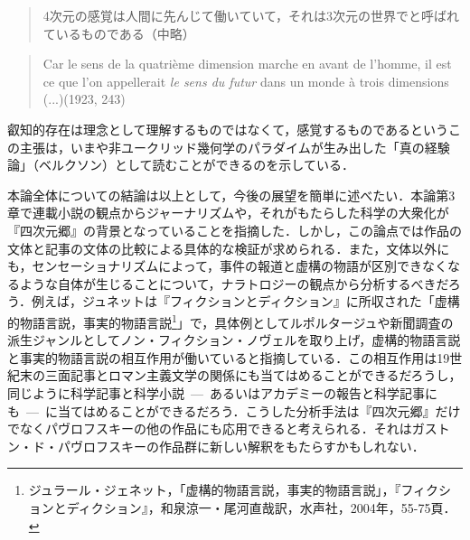\begin{quote}
4次元の感覚は人間に先んじて働いていて，それは3次元の世界でと呼ばれているものである（中略）
\end{quote}
\begin{quote}
  Car le sens de la quatrième dimension marche en avant de l'homme, il est ce que l'on appellerait \emph{le sens du futur} dans un monde à trois dimensions (...)(1923, 243)
\end{quote}
叡知的存在は理念として理解するものではなくて，感覚するものであるというこの主張は，いまや非ユークリッド幾何学のパラダイムが生み出した「真の経験論」（ベルクソン）として読むことができるのを示している．

本論全体についての結論は以上として，今後の展望を簡単に述べたい．本論第3章で連載小説の観点からジャーナリズムや，それがもたらした科学の大衆化が『四次元郷』の背景となっていることを指摘した．しかし，この論点では作品の文体と記事の文体の比較による具体的な検証が求められる．また，文体以外にも，センセーショナリズムによって，事件の報道と虚構の物語が区別できなくなるような自体が生じることについて，ナラトロジーの観点から分析するべきだろう．例えば，ジュネットは『フィクションとディクション』に所収された「虚構的物語言説，事実的物語言説\footnote{ジュラール・ジェネット，「虚構的物語言説，事実的物語言説」，『フィクションとディクション』，和泉涼一・尾河直哉訳，水声社，2004年，55-75頁．}」で，具体例としてルポルタージュや新聞調査の派生ジャンルとしてノン・フィクション・ノヴェルを取り上げ，虚構的物語言説と事実的物語言説の相互作用が働いていると指摘している．この相互作用は19世紀末の三面記事とロマン主義文学の関係にも当てはめることができるだろうし，同じように科学記事と科学小説~---~あるいはアカデミーの報告と科学記事にも~---~に当てはめることができるだろう．こうした分析手法は『四次元郷』だけでなくパヴロフスキーの他の作品にも応用できると考えられる．それはガストン・ド・パヴロフスキーの作品群に新しい解釈をもたらすかもしれない．

